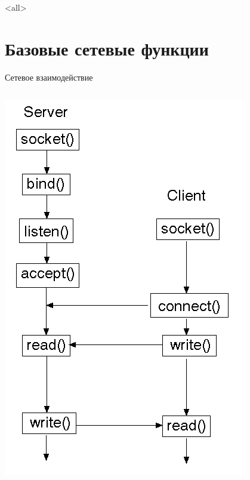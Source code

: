 

\subtitle{Программный интерфейс взаимодействия сокетов Беркли\\(проолжение)}



\mode<all>{}

%
%

\section{Базовые сетевые функции}
\begin{frame}{Сетевое взаимодействие}
	\begin{columns}
	\begin{center}
		\includegraphics[height=0.8\textheight]{06-tcp_seq.png}
	\end{center}

\end{columns}
\end{frame}
